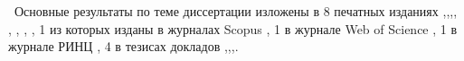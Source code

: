 \publications\ Основные результаты по теме диссертации изложены в 8 печатных изданиях  \cite{Lobachevskii},\cite{WCIT-2012},\cite{AINL-2013},\cite{ISGZ}, \cite{IJSE-1}, \cite{IJSE-2}, \cite{RCDL-2014}, \cite{AMSTA-2015},
1 из которых изданы в журналах Scopus \cite{RCDL-2014}, 1 в журнале Web of Science \cite{AMSTA-2015}, 1 в журнале РИНЦ  \cite{ISGZ}, 
4 в тезисах докладов \cite{Lobachevskii},\cite{WCIT-2012},\cite{AINL-2013},\cite{ISGZ}.



